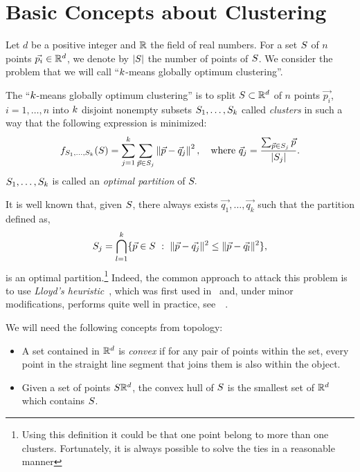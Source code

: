 \documentclass{article}
\begin{document}
\section{Basic Concepts about Clustering}
\label{sec:BasicConceptsClustering}
Let $d$ be a positive integer and $\mathbb{R}$ the field of real numbers.
For a set $S$ of $n$ points $\vec{p_i}\in \mathbb{R}^d$, we denote by
$|S|$ the number of points of $S$. We consider the problem that
we will call  ``$k$-means globally optimum clustering''.
\begin{definition}
  The ``$k$-means globally optimum clustering'' is to split  
  $S\subset\mathbb{R}^{d}$ of $n$ points $\vec{p_i}$, $i=1,\ldots, n$ into
  $k$ disjoint 
  nonempty subsets $S_1,\ldots, S_{k}$ called \textit{clusters}
  in such a way that the following expression is minimized:
  \begin{equation*}
    f_{S_1,\ldots,S_{k}}(S)=\sum_{j=1}^k \sum_{\vec{p} \in S_j}
    \left\|\vec{p}-\vec{q}_j\right\|^2,\quad\text{where }
    \vec{q}_j = \frac{\sum_{\vec{p} \in S_j} \vec{p}}{|S_j|}.
  \end{equation*}
  $S_1,\ldots, S_{k}$ is called an \textit{optimal partition}
  of $S.$
\end{definition}
It is well known that, given $S$, there always exists
$\vec{q_1},\ldots, \vec{q_k}$ such that the partition defined as,
\begin{equation*}
  \Set_j=\bigcap_{l=1}^{k}\{\vec{p}\in\Set\ :\ 
  \|\vec{p}-\vec{q_j}\|^2\le \|\vec{p}-\vec{q_l}\|^2\},
\end{equation*}
is an optimal partition.\footnote{Using this definition it could be
  that one point belong to more than one clusters. Fortunately, it is
  always possible to solve the ties in a reasonable manner}
Indeed, the common approach to attack this problem is to use 
\textit{Lloyd's heuristic}~\cite{Lloy82}, which was first used
in~\cite{MacQ67} and, under minor modifications, performs quite well
in practice, see~~\cite{arthurVas07,ZhangXia09}.

We will need the following concepts from topology:
\begin{itemize}
\item A  set contained in $\mathbb{R}^d$  is \textit{convex} if for any
  pair of points within the set, every point in the straight line
  segment that joins them is also within the object.
\item Given a set of points $S\mathbb{R}^{d}$, the convex hull of $S$ is the
  smallest set of $\mathbb{R}^{d}$ which contains $S$.

\end{itemize}
\end{document}
